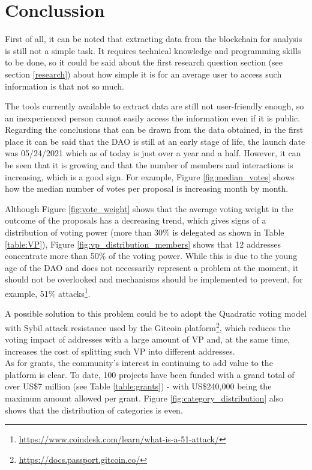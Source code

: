 \documentclass[MSE,Master,english]{twbook}%
\begin{document}
\chapter{Conclussion\label{conclussion}}
First of all, it can be noted that extracting data from the blockchain for analysis is still not a simple task. It requires technical knowledge and programming skills to be done, so it could be said about the first research question section (see section \ref{research}) about how simple it is for an average user to access such information is that not so much.

The tools currently available to extract data are still not user-friendly enough, so an inexperienced person cannot easily access the information even if it is public. \\

Regarding the conclusions that can be drawn from the data obtained, in the first place it can be said that the DAO is still at an early stage of life, the launch date was 05/24/2021 which as of today is just over a year and a half. However, it can be seen that it is growing and that the number of members and interactions is increasing, which is a good sign. For example, Figure \ref{fig:median_votes} shows how the median number of votes per proposal is increasing month by month.

Although Figure \ref{fig:vote_weight} shows that the average voting weight in the outcome of the proposals has a decreasing trend, which gives signs of a distribution of voting power (more than 30\% is delegated as shown in Table \ref{table:VP}), Figure \ref{fig:vp_distribution_members} shows that 12 addresses concentrate more than 50\% of the voting power. While this is due to the young age of the DAO and does not necessarily represent a problem at the moment, it should not be overlooked and mechanisms should be implemented to prevent, for example, 51\% attacks\footnote{\url{https://www.coindesk.com/learn/what-is-a-51-attack/}}. 

A possible solution to this problem could be to adopt the Quadratic voting model with Sybil attack resistance used by the Gitcoin platform\footnote{\url{https://docs.passport.gitcoin.co/}}, which reduces the voting impact of addresses with a large amount of VP and, at the same time, increases the cost of splitting such VP into different addresses. \\

As for grants, the community's interest in continuing to add value to the platform is clear.  To date, 100 projects have been funded with a grand total of over US\$7 million (see Table \ref{table:grants}) - with US\$240,000 being the maximum amount allowed per grant. Figure \ref{fig:category_distribution} also shows that the distribution of categories is even.
\end{document}

